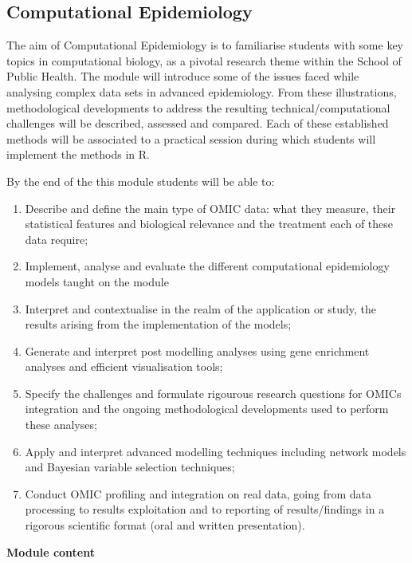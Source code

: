 \documentclass[
]{book}
\providecommand{\tightlist}{%
  \setlength{\itemsep}{0pt}\setlength{\parskip}{0pt}}
\begin{document}
\subsection*{Computational Epidemiology}\label{computational-epidemiology}

The aim of Computational Epidemiology is to familiarise students with some key topics in computational biology, as a pivotal research theme within the School of Public Health. The module will introduce some of the issues faced while analysing complex data sets in advanced epidemiology. From these illustrations, methodological developments to address the resulting technical/computational challenges will be described, assessed and compared. Each of these established methods will be associated to a practical session during which students will implement the methods in R.

By the end of the this module students will be able to:

\begin{enumerate}
\def\labelenumi{\arabic{enumi}.}
\tightlist
\item
  Describe and define the main type of OMIC data: what they measure, their statistical features and biological relevance and the treatment each of these data require;
\item
  Implement, analyse and evaluate the different computational epidemiology models taught on the module
\item
  Interpret and contextualise in the realm of the application or study, the results arising from the implementation of the models;
\item
  Generate and interpret post modelling analyses using gene enrichment analyses and efficient visualisation tools;
\item
  Specify the challenges and formulate rigourous research questions for OMICs integration and the ongoing methodological developments used to perform these analyses;
\item
  Apply and interpret advanced modelling techniques including network models and Bayesian variable selection techniques;
\item
  Conduct OMIC profiling and integration on real data, going from data processing to results exploitation and to reporting of results/findings in a rigorous scientific format (oral and written presentation).
\end{enumerate}

\textbf{Module content}
\end{document}
